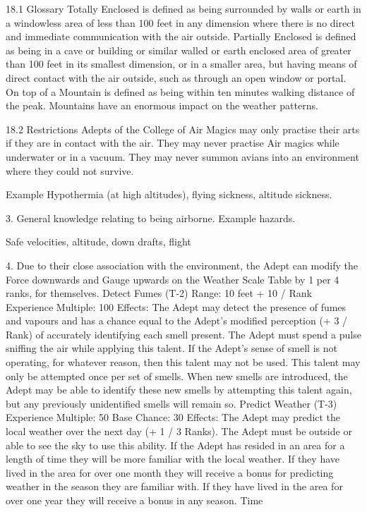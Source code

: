 \documentclass[a4paper]{article}
\begin{document}
\begin{multicols}{3}
18.1 Glossary
Totally Enclosed is defined as being surrounded by
walls or earth in a windowless area of less than 100
feet in any dimension where there is no direct and
immediate communication with the air outside.
Partially Enclosed is defined as being in a cave or
building or similar walled or earth enclosed area of
greater than 100 feet in its smallest dimension, or
in a smaller area, but having means of direct contact with the air outside, such as through an open
window or portal.
On top of a Mountain is defined as being within ten
minutes walking distance of the peak. Mountains
have an enormous impact on the weather patterns.

18.2 Restrictions
Adepts of the College of Air Magics may only
practise their arts if they are in contact with the air.
They may never practise Air magics while underwater or in a vacuum. They may never summon
avians into an environment where they could not
survive.

Example
Hypothermia (at high altitudes), flying
sickness, altitude sickness.

3. General knowledge relating to being airborne.
Example
hazards.

Safe velocities, altitude, down drafts, flight

4. Due to their close association with the environment, the Adept can modify the Force downwards
and Gauge upwards on the Weather Scale Table by
1 per 4 ranks, for themselves.
Detect Fumes (T-2)
Range: 10 feet + 10 / Rank
Experience Multiple: 100
Effects: The Adept may detect the presence of
fumes and vapours and has a chance equal to the
Adept’s modified perception (+ 3 / Rank) of accurately identifying each smell present. The Adept
must spend a pulse sniffing the air while applying
this talent. If the Adept’s sense of smell is not
operating, for whatever reason, then this talent may
not be used. This talent may only be attempted
once per set of smells. When new smells are introduced, the Adept may be able to identify these new
smells by attempting this talent again, but any
previously unidentified smells will remain so.
Predict Weather (T-3)
Experience Multiple: 50
Base Chance: 30%
Effects: The Adept may predict the local weather
over the next day (+ 1 / 3 Ranks). The Adept must
be outside or able to see the sky to use this ability.
If the Adept has resided in an area for a length of
time they will be more familiar with the local
weather. If they have lived in the area for over one
month they will receive a bonus for predicting
weather in the season they are familiar with. If they
have lived in the area for over one year they will
receive a bonus in any season.
Time


\end{multicols}
\end{document}
